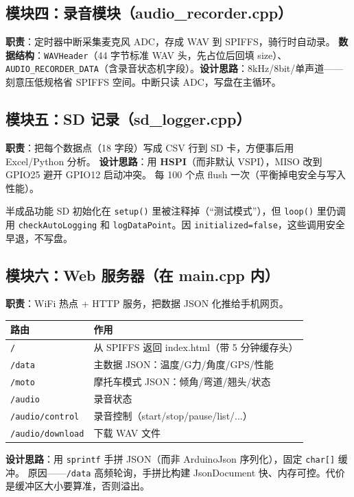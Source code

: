 \documentclass[UTF8,11pt,a4paper]{ctexart}
\begin{document}
\subsection{模块四：录音模块（audio_recorder.cpp）}
\textbf{职责}：定时器中断采集麦克风 ADC，存成 WAV 到 SPIFFS，骑行时自动录。
\textbf{数据结构}：\texttt{WAVHeader}（44 字节标准 WAV 头，先占位后回填 size）、
\texttt{AUDIO\_RECORDER\_DATA}（含录音状态机字段）。\textbf{设计思路}：8kHz/8bit/单声道——
刻意压低规格省 SPIFFS 空间。中断只读 ADC，写盘在主循环。

\subsection{模块五：SD 记录（sd_logger.cpp）}
\textbf{职责}：把每个数据点（18 字段）写成 CSV 行到 SD 卡，方便事后用 Excel/Python 分析。
\textbf{设计思路}：用 \textbf{HSPI}（而非默认 VSPI），MISO 改到 GPIO25 避开 GPIO12 启动冲突。
每 100 个点 flush 一次（平衡掉电安全与写入性能）。
\begin{warn}{半成品功能}
SD 初始化在 \texttt{setup()} 里被注释掉（“测试模式”），但 \texttt{loop()} 里仍调用
\texttt{checkAutoLogging} 和 \texttt{logDataPoint}。因 \texttt{initialized=false}，这些调用安全早退，不写盘。
\end{warn}

\subsection{模块六：Web 服务器（在 main.cpp 内）}
\textbf{职责}：WiFi 热点 + HTTP 服务，把数据 JSON 化推给手机网页。
\begin{center}\small
\begin{tabularx}{\linewidth}{@{}lX@{}}
\toprule
\textbf{路由} & \textbf{作用} \\
\midrule
\texttt{/} & 从 SPIFFS 返回 index.html（带 5 分钟缓存头） \\
\texttt{/data} & 主数据 JSON：温度/G力/角度/GPS/性能 \\
\texttt{/moto} & 摩托车模式 JSON：倾角/弯道/翘头/状态 \\
\texttt{/audio} & 录音状态 \\
\texttt{/audio/control} & 录音控制（start/stop/pause/list/...） \\
\texttt{/audio/download} & 下载 WAV 文件 \\
\bottomrule
\end{tabularx}
\end{center}
\textbf{设计思路}：用 \texttt{sprintf} 手拼 JSON（而非 ArduinoJson 序列化），固定 \texttt{char[]} 缓冲。
原因——\texttt{/data} 高频轮询，手拼比构建 JsonDocument 快、内存可控。代价是缓冲区大小要算准，否则溢出。
\end{document}
